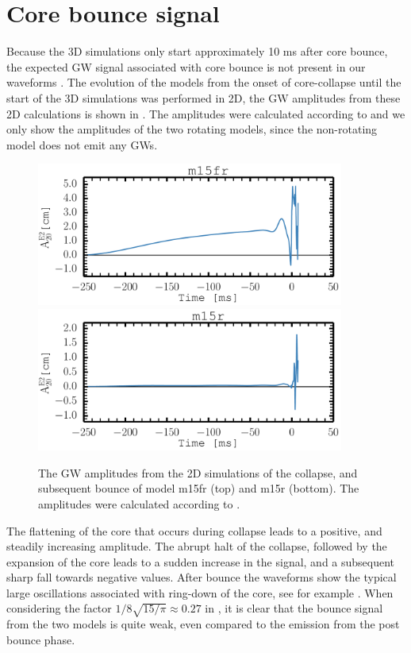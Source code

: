 \section{Core bounce signal}
Because the 3D simulations only start approximately 10 ms after core bounce, the
expected GW signal associated with core bounce is not present in our waveforms .
The evolution of the models from the onset of core-collapse until the start of the 3D simulations
was performed in 2D, the GW amplitudes from these 2D calculations is shown in .
The amplitudes were calculated according to  and we only show the amplitudes of the two
rotating models, since the non-rotating model does not emit any GWs.
\begin{figure}[ht]         
\centering                            
\includegraphics[width=0.9\textwidth]{./images/paper2/bounce_fr.pdf} \\
\includegraphics[width=0.9\textwidth]{./images/paper2/bounce_r.pdf}
\caption{The GW amplitudes from the 2D simulations of the collapse, and subsequent bounce
of model m15fr (top) and m15r (bottom). The amplitudes were calculated according to .
\label{figp2:bounce}}
\end{figure}
The flattening of the core that occurs during collapse leads to a positive, and steadily increasing
amplitude. The abrupt halt of the collapse, followed by the expansion of the core leads to a sudden 
increase in the signal, and a subsequent sharp fall towards negative values. After bounce the waveforms show
the typical large oscillations associated with ring-down of the core, see for example 
\cite{mueller_82,finn_90,moenchmeyer_91,yamada_95,zwerger_97}.
When considering the factor ${1}/{8}\sqrt{15/\pi} \approx 0.27$ in , it is clear that
the bounce signal from the two models is quite weak, even compared to the emission from the post bounce phase.

